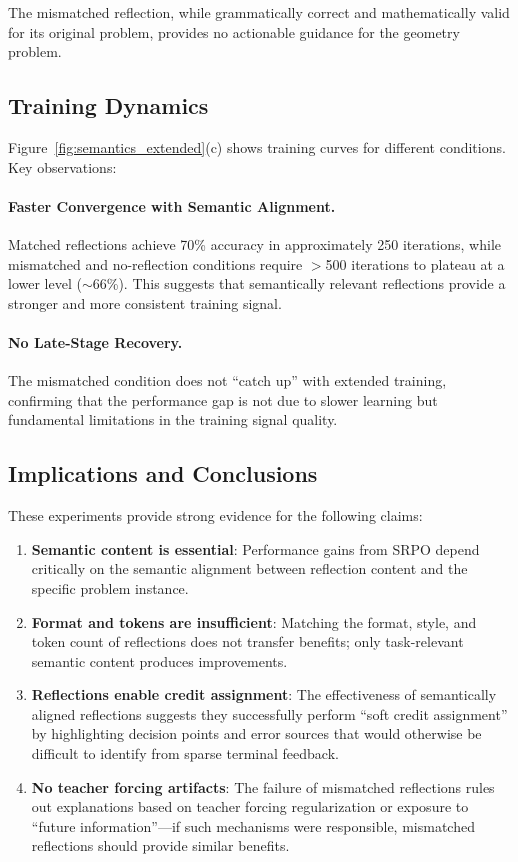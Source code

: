 \documentclass{article}
\newcommand{\method}{SRPO}
\theoremstyle{plain}
\theoremstyle{definition}
\theoremstyle{remark}
\begin{document}
The mismatched reflection, while grammatically correct and mathematically valid for its original problem, provides no actionable guidance for the geometry problem.

\subsection{Training Dynamics}

Figure~\ref{fig:semantics_extended}(c) shows training curves for different conditions. Key observations:

\paragraph{Faster Convergence with Semantic Alignment.}
Matched reflections achieve 70\% accuracy in approximately 250 iterations, while mismatched and no-reflection conditions require $>$500 iterations to plateau at a lower level ($\sim$66\%). This suggests that semantically relevant reflections provide a stronger and more consistent training signal.

\paragraph{No Late-Stage Recovery.}
The mismatched condition does not ``catch up'' with extended training, confirming that the performance gap is not due to slower learning but fundamental limitations in the training signal quality.

\subsection{Implications and Conclusions}

These experiments provide strong evidence for the following claims:

\begin{enumerate}
    \item \textbf{Semantic content is essential}: Performance gains from \method{} depend critically on the semantic alignment between reflection content and the specific problem instance.
    
    \item \textbf{Format and tokens are insufficient}: Matching the format, style, and token count of reflections does not transfer benefits; only task-relevant semantic content produces improvements.
    
    \item \textbf{Reflections enable credit assignment}: The effectiveness of semantically aligned reflections suggests they successfully perform ``soft credit assignment'' by highlighting decision points and error sources that would otherwise be difficult to identify from sparse terminal feedback.
    
    \item \textbf{No teacher forcing artifacts}: The failure of mismatched reflections rules out explanations based on teacher forcing regularization or exposure to ``future information''—if such mechanisms were responsible, mismatched reflections should provide similar benefits.
\end{enumerate}
\end{document}
